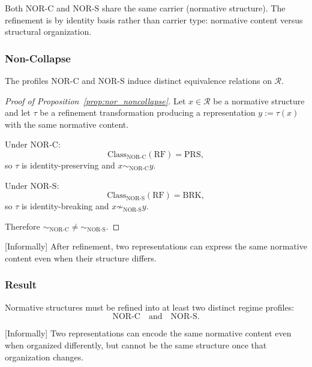 Both $\mathrm{NOR\mbox{-}C}$ and $\mathrm{NOR\mbox{-}S}$ share the same carrier
(normative structure). The refinement is by identity basis rather than carrier type:
normative content versus structural organization.


\subsubsection{Non-Collapse}

\begin{proposition}
\label{prop:nor_noncollapse}
The profiles $\mathrm{NOR\mbox{-}C}$ and $\mathrm{NOR\mbox{-}S}$ induce
distinct equivalence relations on $\mathcal{R}$.
\end{proposition}

\begin{proof}[Proof of Proposition~\ref{prop:nor_noncollapse}]
Let $x \in \mathcal{R}$ be a normative structure and let $\tau$ be a
refinement transformation producing a representation
$y := \tau(x)$ with the same normative content.

Under $\mathrm{NOR\mbox{-}C}$:
\[
\mathrm{Class}_{\mathrm{NOR\mbox{-}C}}(\mathrm{RF}) = \mathrm{PRS},
\]
so $\tau$ is identity-preserving and $x \sim_{\mathrm{NOR\mbox{-}C}} y$.

Under $\mathrm{NOR\mbox{-}S}$:
\[
\mathrm{Class}_{\mathrm{NOR\mbox{-}S}}(\mathrm{RF}) = \mathrm{BRK},
\]
so $\tau$ is identity-breaking and $x \not\sim_{\mathrm{NOR\mbox{-}S}} y$.

Therefore $\sim_{\mathrm{NOR\mbox{-}C}} \neq \sim_{\mathrm{NOR\mbox{-}S}}$.
\end{proof}

[Informally]
After refinement, two representations can express the same normative content
even when their structure differs.


\subsubsection{Result}

\begin{theorem}
Normative structures must be refined into at least two distinct regime profiles:
\[
\mathrm{NOR\mbox{-}C}
\quad\text{and}\quad
\mathrm{NOR\mbox{-}S}.
\]
\end{theorem}

[Informally]
Two representations can encode the same normative content even when organized differently,
but cannot be the same structure once that organization changes.

